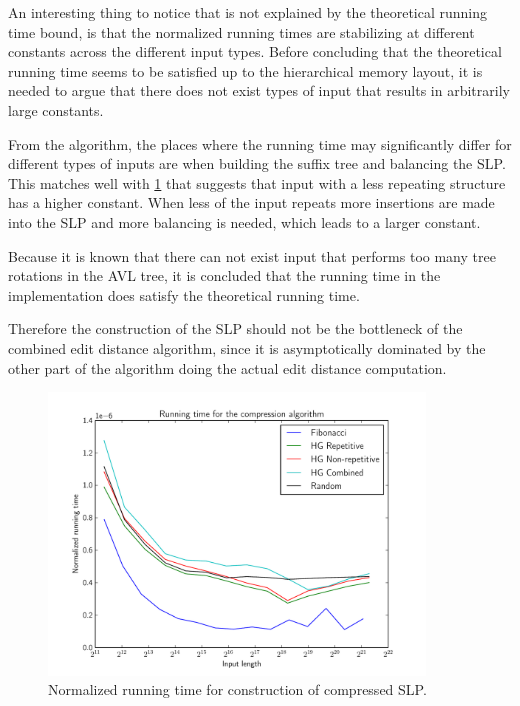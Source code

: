 \documentclass[twoside,11pt,openright]{report}
\begin{document}
An interesting thing to notice that is not explained by the theoretical running time bound, is that the normalized running times are stabilizing at different constants across the different input types. Before concluding that the theoretical running time seems to be satisfied up to the hierarchical memory layout, it is needed to argue that there does not exist types of input that results in arbitrarily large constants.

From the algorithm, the places where the running time may significantly differ for different types of inputs are when building the suffix tree and balancing the SLP. This matches well with \cref{fig:compression:runningtime} that suggests that input with a less repeating structure has a higher constant. When less of the input repeats more insertions are made into the SLP and more balancing is needed, which leads to a larger constant.

Because it is known that there can not exist input that performs too many tree rotations in the AVL tree, it is concluded that the running time in the implementation does satisfy the theoretical running time.

Therefore the construction of the SLP should not be the bottleneck of the combined edit distance algorithm, since it is asymptotically dominated by the other part of the algorithm doing the actual edit distance computation.
%
\begin{figure}[!htb]
  \centering
  \includegraphics[width=10cm]{compression/runningtime}
  \caption{Normalized running time for construction of compressed SLP.}
  \label{fig:compression:runningtime}
\end{figure}
\end{document}
